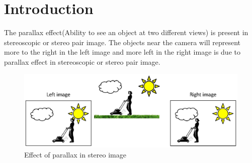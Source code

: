 \chapter{Introduction}
\label{ChapterIntroduction}
%
The parallax effect(Ability to see an object at two different views) is present in stereoscopic or stereo pair image. The objects near the camera will represent more to the right in the left image and more left in the right image is due to parallax effect in stereoscopic or stereo pair   image. 
\begin{figure}[h] 
  \includegraphics[width=5in]{parallax.eps}
  \caption{Effect of parallax in stereo image } \label{rp}
\end{figure}

